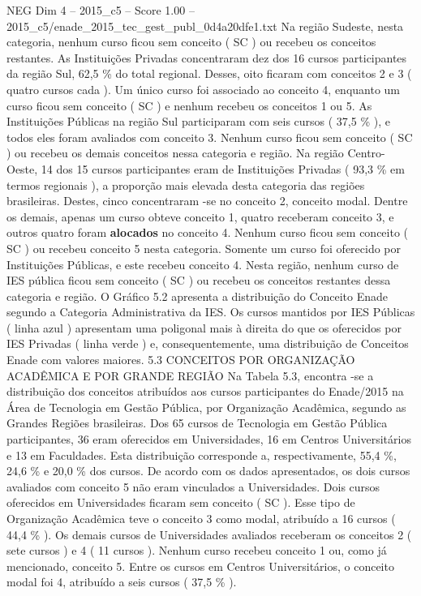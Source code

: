 \begin{textsample}{NEG Dim 4 – 2015\_c5 – Score 1.00 – 2015\_c5/enade\_2015\_tec\_gest\_publ\_0d4a20dfe1.txt}
Na região Sudeste, nesta categoria, nenhum curso ficou sem conceito ( SC ) ou recebeu os conceitos restantes.
As Instituições Privadas concentraram dez dos 16 cursos participantes da região Sul, 62,5 \% do total regional.
Desses, oito ficaram com conceitos 2 e 3 ( quatro cursos cada ).
Um único curso foi associado ao conceito 4, enquanto um curso ficou sem conceito ( SC ) e nenhum recebeu os conceitos 1 ou 5.
As Instituições Públicas na região Sul participaram com seis cursos ( 37,5 \% ), e todos eles foram avaliados com conceito 3.
Nenhum curso ficou sem conceito ( SC ) ou recebeu os demais conceitos nessa categoria e região.
Na região Centro-Oeste, 14 dos 15 cursos participantes eram de Instituições Privadas ( 93,3 \% em termos regionais ), a proporção mais elevada desta categoria das regiões brasileiras.
Destes, cinco concentraram -se no conceito 2, conceito modal.
Dentre os demais, apenas um curso obteve conceito 1, quatro receberam conceito 3, e outros quatro foram \textbf{alocados} no conceito 4.
Nenhum curso ficou sem conceito ( SC ) ou recebeu conceito 5 nesta categoria.
Somente um curso foi oferecido por Instituições Públicas, e este recebeu conceito 4.
Nesta região, nenhum curso de IES pública ficou sem conceito ( SC ) ou recebeu os conceitos restantes dessa categoria e região.
O Gráfico 5.2 apresenta a distribuição do Conceito Enade segundo a Categoria Administrativa da IES.
Os cursos mantidos por IES Públicas ( linha azul ) apresentam uma poligonal mais à direita do que os oferecidos por IES Privadas ( linha verde ) e, consequentemente, uma distribuição de Conceitos Enade com valores maiores. 5.3 CONCEITOS POR ORGANIZAÇÃO ACADÊMICA E POR GRANDE REGIÃO Na Tabela 5.3, encontra -se a distribuição dos conceitos atribuídos aos cursos participantes do Enade/2015 na Área de Tecnologia em Gestão Pública, por Organização Acadêmica, segundo as Grandes Regiões brasileiras.
Dos 65 cursos de Tecnologia em Gestão Pública participantes, 36 eram oferecidos em Universidades, 16 em Centros Universitários e 13 em Faculdades.
Esta distribuição corresponde a, respectivamente, 55,4 \%, 24,6 \% e 20,0 \% dos cursos.
De acordo com os dados apresentados, os dois cursos avaliados com conceito 5 não eram vinculados a Universidades.
Dois cursos oferecidos em Universidades ficaram sem conceito ( SC ).
Esse tipo de Organização Acadêmica teve o conceito 3 como modal, atribuído a 16 cursos ( 44,4 \% ).
Os demais cursos de Universidades avaliados receberam os conceitos 2 ( sete cursos ) e 4 ( 11 cursos ).
Nenhum curso recebeu conceito 1 ou, como já mencionado, conceito 5.
Entre os cursos em Centros Universitários, o conceito modal foi 4, atribuído a seis cursos ( 37,5 \% ).

\end{textsample}
